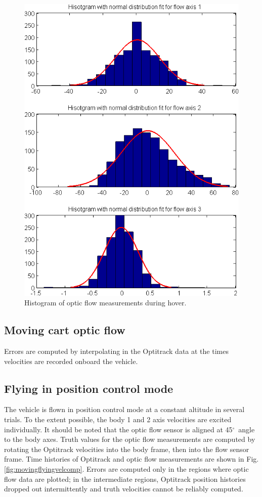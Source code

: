 \documentclass{article}
\newcommand{\degree}{\ensuremath{^\circ}}
\begin{document}
\begin{figure}[tb!]
\centering
\includegraphics[scale=0.8]{../flowhist.png}
\caption{Histogram of optic flow measurements during hover.}
\label{fig:flowhist}
\end{figure}

\subsection{Moving cart optic flow}

Errors are computed by interpolating in the Optitrack data at the times velocities are recorded onboard the vehicle. 

\subsection{Flying in position control mode}

The vehicle is flown in position control mode at a constant altitude in several trials. To the extent possible, the body 1 and 2 axis velocities are excited individually. It should be noted that the optic flow sensor is aligned at 45\degree \ angle to the body axes. Truth values for the optic flow measurements are computed by rotating the Optitrack velocities into the body frame, then into the flow sensor frame. Time histories of Optitrack and optic flow measurements are shown in Fig. \ref{fig:movingflyingvelcomp}. Errors are computed only in the regions where optic flow data are plotted; in the intermediate regions, Optitrack position histories dropped out intermittently and truth velocities cannot be reliably computed.
\end{document}
